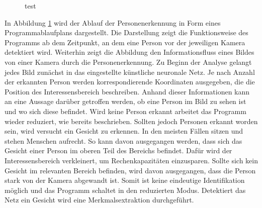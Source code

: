 	\begin{figure}[H]
		\centering
		\caption{test}
		\label{fig: bbox}
	\end{figure}

	In Abbildung \ref{fig: bbox} wird der Ablauf der Personenerkennung in Form eines Programmablaufplans dargestellt. Die Darstellung zeigt die Funktionsweise des Programms ab dem Zeitpunkt, an dem eine Person vor der jeweiligen Kamera detektiert wird. Weiterhin zeigt die Abbildung den Informationsfluss eines Bildes von einer Kamera durch die Personenerkennung. Zu Beginn der Analyse gelangt jedes Bild zunächst in das eingestellte künstliche neuronale Netz. Je nach Anzahl der erkannten Person werden korrespondierende Koordinaten ausgegeben, die die Position des Interessensbereich beschreiben. Anhand dieser Informationen kann an eine Aussage darüber getroffen werden, ob eine Person im Bild zu sehen ist und wo sich diese befindet. Wird keine Person erkannt arbeitet das Programm wieder reduziert, wie bereits beschrieben. Sollten jedoch Personen erkannt worden sein, wird versucht ein Gesicht zu erkennen. In den meisten Fällen sitzen und stehen Menschen aufrecht. So kann davon ausgegangen werden, dass sich das Gesicht einer Person im oberen Teil des Bereichs befindet. Dafür wird der Interessensbereich verkleinert, um Rechenkapazitäten einzusparen. Sollte sich kein Gesicht im relevanten Bereich befinden, wird davon ausgegangen, dass die Person stark von der Kamera abgewandt ist. Somit ist keine eindeutige Identifikation möglich und das Programm schaltet in den reduzierten Modus. Detektiert das Netz ein Gesicht wird eine Merkmalsextraktion durchgeführt.\\
	

